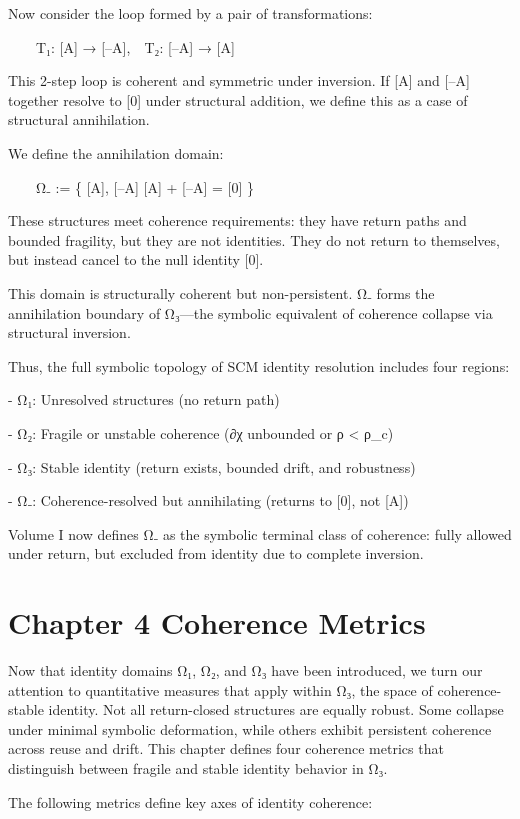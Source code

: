 Now consider the loop formed by a pair of transformations:

  T₁: {[}A{]} → {[}--A{]}, T₂: {[}--A{]} → {[}A{]}

This 2-step loop is coherent and symmetric under inversion. If {[}A{]}
and {[}--A{]} together resolve to {[}0{]} under structural addition, we
define this as a case of structural annihilation.

We define the annihilation domain:

  Ω₋ := \{ {[}A{]}, {[}--A{]} \textbar{} {[}A{]} + {[}--A{]} = {[}0{]}
\}

These structures meet coherence requirements: they have return paths and
bounded fragility, but they are not identities. They do not return to
themselves, but instead cancel to the null identity {[}0{]}.

This domain is structurally coherent but non-persistent. Ω₋ forms the
annihilation boundary of Ω₃---the symbolic equivalent of coherence
collapse via structural inversion.

Thus, the full symbolic topology of SCM identity resolution includes
four regions:

- Ω₁: Unresolved structures (no return path)

- Ω₂: Fragile or unstable coherence (∂χ unbounded or ρ \textless{} ρ\_c)

- Ω₃: Stable identity (return exists, bounded drift, and robustness)

- Ω₋: Coherence-resolved but annihilating (returns to {[}0{]}, not
{[}A{]})

Volume I now defines Ω₋ as the symbolic terminal class of coherence:
fully allowed under return, but excluded from identity due to complete
inversion.

\section{Chapter 4 \textbar{} Coherence
Metrics}\label{chapter-4-coherence-metrics}

Now that identity domains Ω₁, Ω₂, and Ω₃ have been introduced, we turn
our attention to quantitative measures that apply within Ω₃, the space
of coherence-stable identity. Not all return-closed structures are
equally robust. Some collapse under minimal symbolic deformation, while
others exhibit persistent coherence across reuse and drift. This chapter
defines four coherence metrics that distinguish between fragile and
stable identity behavior in Ω₃.

The following metrics define key axes of identity coherence:

